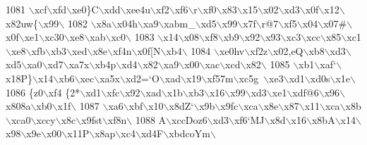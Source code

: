 \begin{DoxyCode}
{1081 \textcolor{stringliteral}{\(\backslash\)xcf\(\backslash\)xfd\(\backslash\)xe0\}C\(\backslash\)xdd\(\backslash\)xee4u\(\backslash\)xf2\(\backslash\)xf6\(\backslash\)r\(\backslash\)xf0\(\backslash\)x83\(\backslash\)x15\(\backslash\)x02\(\backslash\)xd3\(\backslash\)x0f\(\backslash\)x12\(\backslash\)x82uw\{\(\backslash\)x99\(\backslash\)}
1082 \textcolor{stringliteral}{\(\backslash\)x8a\(\backslash\)x04h\(\backslash\)xa9\(\backslash\)xabm\_\(\backslash\)xd5\(\backslash\)x99\(\backslash\)x7f\(\backslash\)r@7\(\backslash\)xf5\(\backslash\)x04\(\backslash\)x07#\(\backslash\)x0f\(\backslash\)xe1\(\backslash\)xc30\(\backslash\)xe8\(\backslash\)xab\(\backslash\)xc0\(\backslash\)}
1083 \textcolor{stringliteral}{\(\backslash\)x14\(\backslash\)x08\(\backslash\)xf8\(\backslash\)xb9\(\backslash\)x92\(\backslash\)x93\(\backslash\)xc3\(\backslash\)xcc\(\backslash\)x85\(\backslash\)xc1\(\backslash\)xe8\(\backslash\)xfb\(\backslash\)xb3\(\backslash\)xed\(\backslash\)x8e\(\backslash\)xf4n\(\backslash\)x0f[N\(\backslash\)xb4\(\backslash\)}
1084 \textcolor{stringliteral}{\(\backslash\)xe0hv\(\backslash\)xf2z\(\backslash\)x02,eQ\(\backslash\)xb8\(\backslash\)xd3\(\backslash\)xd5\(\backslash\)xa0\(\backslash\)xd7\(\backslash\)xa7x\(\backslash\)xb4p\(\backslash\)xd4\(\backslash\)x82\(\backslash\)xa9\(\backslash\)x00\(\backslash\)xac\(\backslash\)xcd\(\backslash\)x82\(\backslash\)}
1085 \textcolor{stringliteral}{\(\backslash\)xb1\(\backslash\)xaf`\(\backslash\)x18P\}\(\backslash\)x14\(\backslash\)xb6\(\backslash\)xec\(\backslash\)xa5x\(\backslash\)xd2=`O\(\backslash\)xad\(\backslash\)x19\(\backslash\)xf57m\(\backslash\)xc5g~\(\backslash\)xe3\(\backslash\)xd1\(\backslash\)xd0s\(\backslash\)x1e\(\backslash\)}
1086 \textcolor{stringliteral}{\{z0\(\backslash\)xf4 \{2*\(\backslash\)xd1\(\backslash\)xfc\(\backslash\)x92\(\backslash\)xad\(\backslash\)x1b\(\backslash\)xb3\(\backslash\)x16\(\backslash\)x99\(\backslash\)xd3\(\backslash\)xe1\(\backslash\)xdf@6\(\backslash\)x96\(\backslash\)x808a\(\backslash\)xb0\(\backslash\)x1f\(\backslash\)}
1087 \textcolor{stringliteral}{\(\backslash\)xa6\(\backslash\)xbf\(\backslash\)x10\(\backslash\)x8dZ`\(\backslash\)x9b\(\backslash\)x9fc\(\backslash\)xca\(\backslash\)x8e\(\backslash\)x87\(\backslash\)x11\(\backslash\)xca\(\backslash\)x8b\(\backslash\)xca0\(\backslash\)xccy\(\backslash\)x8c\(\backslash\)x9fst\(\backslash\)xf8n\(\backslash\)}
1088 \textcolor{stringliteral}{A\(\backslash\)xccDoz6\(\backslash\)xd3\(\backslash\)xf6`MJ\(\backslash\)x8d\(\backslash\)x16\(\backslash\)x8bA\(\backslash\)x14\(\backslash\)x98\(\backslash\)x9e\(\backslash\)x00\(\backslash\)x11P\(\backslash\)x8ap\(\backslash\)xc4\(\backslash\)xd4F\(\backslash\)xbdcoYm\(\backslash\)}
}
\end{DoxyCode}
